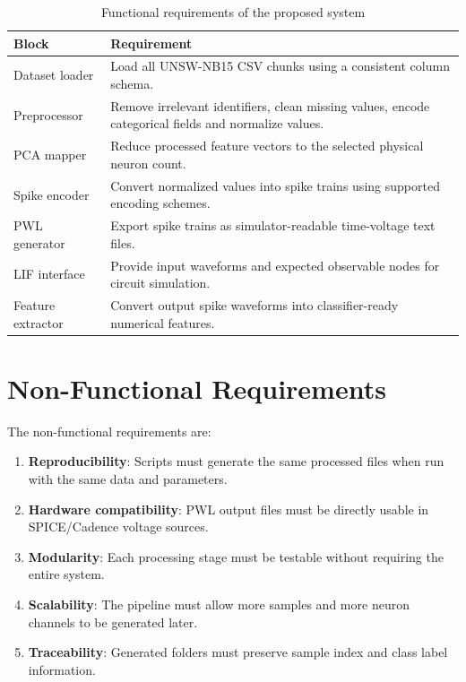 \begin{table}[H]
\centering
\caption{Functional requirements of the proposed system}
\label{tab:functionalrequirements}
\begin{tabular}{|p{}|p{}|}
\hline
\textbf{Block} & \textbf{Requirement} \\
\hline
Dataset loader & Load all UNSW-NB15 CSV chunks using a consistent column schema. \\
\hline
Preprocessor & Remove irrelevant identifiers, clean missing values, encode categorical fields and normalize values. \\
\hline
PCA mapper & Reduce processed feature vectors to the selected physical neuron count. \\
\hline
Spike encoder & Convert normalized values into spike trains using supported encoding schemes. \\
\hline
PWL generator & Export spike trains as simulator-readable time-voltage text files. \\
\hline
LIF interface & Provide input waveforms and expected observable nodes for circuit simulation. \\
\hline
Feature extractor & Convert output spike waveforms into classifier-ready numerical features. \\
\hline
\end{tabular}
\end{table}

\section{Non-Functional Requirements}

The non-functional requirements are:
\begin{enumerate}
\item \textbf{Reproducibility}: Scripts must generate the same processed files when run with the same data and parameters.
\item \textbf{Hardware compatibility}: PWL output files must be directly usable in SPICE/Cadence voltage sources.
\item \textbf{Modularity}: Each processing stage must be testable without requiring the entire system.
\item \textbf{Scalability}: The pipeline must allow more samples and more neuron channels to be generated later.
\item \textbf{Traceability}: Generated folders must preserve sample index and class label information.
\end{enumerate}


